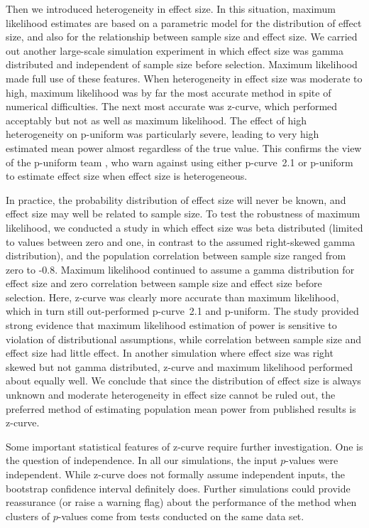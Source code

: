 \documentclass[jou]{apa6} %
\begin{document}
Then we introduced heterogeneity in effect size. In this situation, maximum likelihood estimates are based on a parametric model for the distribution of effect size, and also for the relationship between sample size and effect size. We carried out another large-scale simulation experiment in which effect size was gamma distributed and independent of sample size before selection. Maximum likelihood made full use of these features. When heterogeneity in effect size was moderate to high, maximum likelihood was by far the most accurate method in spite of numerical difficulties. The next most accurate was z-curve, which performed acceptably but not as well as maximum likelihood. The effect of high heterogeneity on p-uniform was particularly severe, leading to very high estimated mean power almost regardless of the true value. This confirms the view of the p-uniform team \parencite{vanAertEtAl2016}, who warn against using either p-curve~2.1 or p-uniform to estimate effect size when effect size is heterogeneous.

In practice, the probability distribution of effect size will never be known, and effect size may well be related to sample size. To test the robustness of maximum likelihood, we conducted a study in which effect size was beta distributed (limited to values between zero and one, in contrast to the assumed right-skewed gamma distribution), and the population correlation between sample size ranged from zero to -0.8. Maximum likelihood continued to assume a gamma distribution for effect size and zero correlation between sample size and effect size before selection. Here, z-curve was clearly more accurate than maximum likelihood, which in turn still out-performed p-curve~2.1 and p-uniform. The study provided strong evidence that maximum likelihood estimation of power is sensitive to violation of distributional assumptions, while correlation between sample size and effect size had little effect. In another simulation where effect size was right skewed but not gamma distributed, z-curve and maximum likelihood performed about equally well. We conclude that since the distribution of effect size is always unknown and moderate heterogeneity in effect size cannot be ruled out, the preferred method of estimating population mean power from published results is z-curve. 

Some important statistical features of z-curve require further investigation. One is the question of independence. In all our simulations, the input $p$-values were independent. While z-curve does not formally assume independent inputs, the bootstrap confidence interval definitely does. Further simulations could provide reassurance (or raise a warning flag) about the performance of the method when clusters of $p$-values come from tests conducted on the same data set. 
\end{document}
